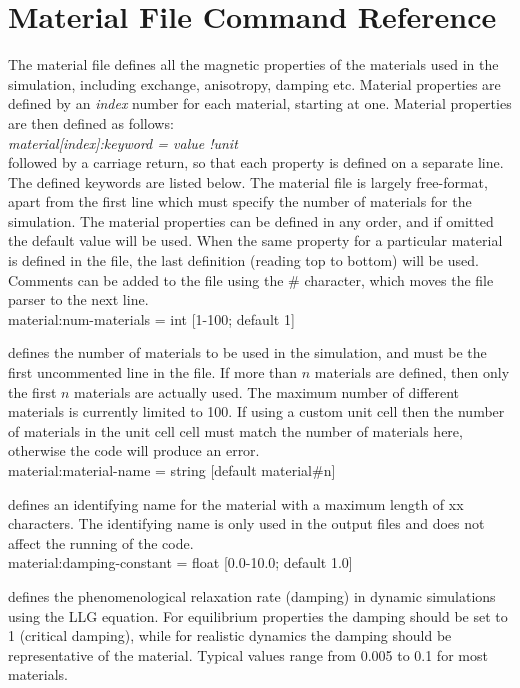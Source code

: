 
\chapter{Material File Command Reference}\label{chap:MaterialFileCommandReference}
The material file defines all the magnetic properties of the materials used in the simulation, including exchange, anisotropy, damping etc. Material properties are defined by an \textit{index} number for each material, starting at one. Material properties are then defined as follows:\\

\textit{material[index]:keyword = value !unit}\\

\noindent followed by a carriage return, so that each property is defined on a separate line. The defined keywords are listed below. The material file is largely free-format, apart from the first line which must specify the number of materials for the simulation. The material properties can be defined in any order, and if omitted the default value will be used. When the same property for a particular material is defined in the file, the last definition (reading top to bottom) will be used. Comments can be added to the file using the \# character, which moves the file parser to the next line.\\

{\zicf material:num-materials = int [1-100; default 1]}
defines the number of materials to be used in the simulation, and must be the first uncommented line in the file. If more than $n$ materials are defined, then only the first $n$ materials are actually used. The maximum number of different materials is currently limited to 100. If using a custom unit cell then the number of materials in the unit cell cell must match the number of materials here, otherwise the code will produce an error.\\

{\zicf material:material-name = string [default material\#n]}
defines an identifying name for the material with a maximum length of xx characters. The identifying name is only used in the output files and does not affect the running of the code.\\

{\zicf material:damping-constant = float [0.0-10.0; default 1.0]} defines the phenomenological relaxation rate (damping) in dynamic simulations using the LLG equation. For equilibrium properties the damping should be set to 1 (critical damping), while for realistic dynamics the damping should be representative of the material. Typical values range from 0.005 to 0.1 for most materials.\\

